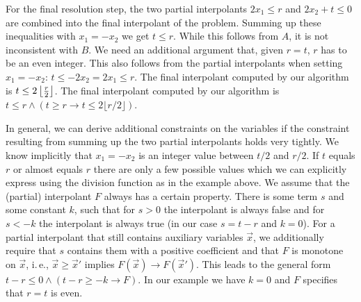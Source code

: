 \begin{example}
For the final resolution step, the two partial interpolants 
$2x_1 \le r$ and $2x_2+t \le 0$ are combined into
the final interpolant of the problem.
Summing up these inequalities with $x_1=-x_2$ we get $t\le r$.  
While this follows from $A$, it is not
inconsistent with $B$.  We need an additional argument that, given $r=t$,
$r$ has to be an even integer.  This also follows from the partial
interpolants when setting $x_1=-x_2$: $t\leq -2x_2 = 2x_1 \leq r$.
\ifnewinterpolation
The final interpolant computed by our algorithm is 
$t \leq 2\left\lfloor \frac{r}{2} \right\rfloor$.
\else
The final interpolant computed by our algorithm is 
$t \leq r \land (t \geq r \rightarrow t \leq 2\lfloor r/2\rfloor)$.
\fi



In general, we can derive additional constraints on the variables
if the constraint resulting from summing up the two partial interpolants
holds very tightly. We know implicitly that $x_1=-x_2$ is an integer
value between $t/2$ and $r/2$.  If $t$ equals
$r$ or almost equals $r$ there are only a few possible values which we can
explicitly express using the division function as in the example above.
\ifnewinterpolation
We assume that the (partial) interpolant $F$ always has a certain
property.  There is some term $s$ and some constant $k$, such that
for $s > 0$ the interpolant is always false and for $s < -k$ the
interpolant is always true (in our case $s = t-r$ and $k = 0$). 
For a partial interpolant that still contains auxiliary variables $\vec x$,
we additionally require that $s$ contains them with a positive coefficient
and that $F$ is monotone on $\vec x$, i.\,e., $\vec x \geq \vec x'$ implies
$F(\vec x) \rightarrow F(\vec x')$.
\else
This leads to the general form $t-r\leq 0\land (t-r\geq
-k\rightarrow F)$.  In our example we have $k=0$ and $F$ specifies
that $r=t$ is even.
\fi
\end{example}

